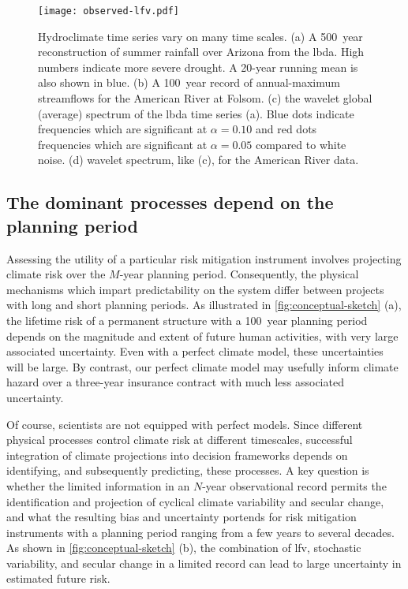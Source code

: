 \documentclass[
]{agujournal2018}
\begin{document}
\begin{figure}
  \centering
  \texttt{[image: observed-lfv.pdf]}
  \caption{
    Hydroclimate time series vary on many time scales.
    (a) A \SI{500}{year} reconstruction of summer rainfall over Arizona from the \acrfull{lbda}.
    High numbers indicate more severe drought.
    A 20-year running mean is also shown in blue.
    (b) A \SI{100}{year} record of annual-maximum streamflows for the American River at Folsom.
    (c) the wavelet global (average) spectrum of the \gls{lbda} time series (a).
    Blue dots indicate frequencies which are significant at $\alpha=0.10$ and red dots frequencies which are significant at $\alpha=0.05$ compared to white noise.
    (d) wavelet spectrum, like (c), for the American River data.
  }\label{fig:observed-lfv}
\end{figure}

\subsection{The dominant processes depend on the planning period}\label{sec:intro-dominant}

Assessing the utility of a particular risk mitigation instrument involves projecting climate risk over the $M$-year planning period.
Consequently, the physical mechanisms which impart predictability on the system differ between projects with long and short planning periods.
As illustrated in \cref{fig:conceptual-sketch} (a), the lifetime risk of a permanent structure with a \SI{100}{year} planning period depends on the magnitude and extent of future human activities, with very large associated uncertainty.
Even with a perfect climate model, these uncertainties will be large.
By contrast, our perfect climate model may usefully inform climate hazard over a three-year insurance contract with much less associated uncertainty.

Of course, scientists are not equipped with perfect models.
Since different physical processes control climate risk at different timescales, successful integration of climate projections into decision frameworks depends on identifying, and subsequently predicting, these processes.
A key question is whether the limited information in an $N$-year observational record permits the identification and projection of cyclical climate variability and secular change, and what the resulting bias and uncertainty portends for risk mitigation instruments with a planning period ranging from a few years to several decades.
As shown in \cref{fig:conceptual-sketch} (b), the combination of \gls{lfv}, stochastic variability, and secular change in a limited record can lead to large uncertainty in estimated future risk.
\end{document}

